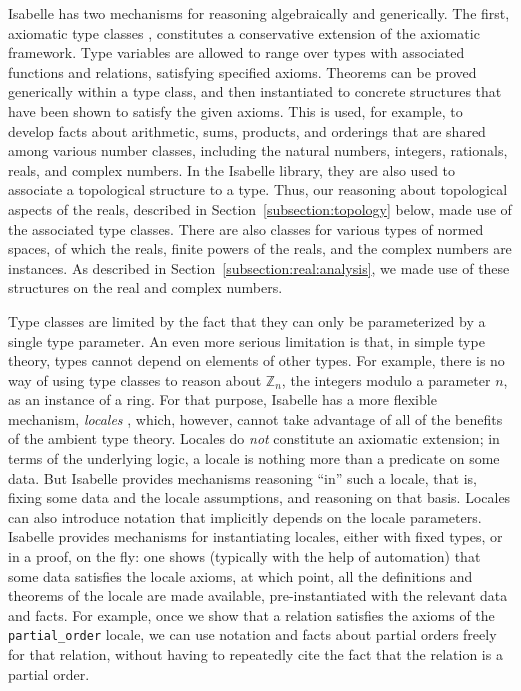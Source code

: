 \documentclass{svjour3}
\newcommand{\ZZ}{\mathbb{Z}}
\begin{document}
Isabelle has two mechanisms for reasoning algebraically and generically. The first, axiomatic type classes \cite{wenzel:97}, constitutes a conservative extension of the axiomatic framework. Type variables are allowed to range over types with associated functions and relations, satisfying specified axioms. Theorems can be proved generically within a type class, and then instantiated to concrete structures that have been shown to satisfy the given axioms. This is used, for example, to develop facts about arithmetic, sums, products, and orderings that are shared among various number classes, including the natural numbers, integers, rationals, reals, and complex numbers. In the Isabelle library, they are also used to associate a topological structure to a type. Thus, our reasoning about topological aspects of the reals, described in Section~\ref{subsection:topology} below, made use of the associated type classes. There are also classes for various types of normed spaces, of which the reals, finite powers of the reals, and the complex numbers are instances. As described in Section~\ref{subsection:real:analysis}, we made use of these structures on the real and complex numbers.

Type classes are limited by the fact that they can only be parameterized by a single type parameter. An even more serious limitation is that, in simple type theory, types cannot depend on elements of other types. For example, there is no way of using type classes to reason about $\ZZ_n$, the integers modulo a parameter $n$, as an instance of a ring. For that purpose, Isabelle has a more flexible mechanism, \emph{locales} \cite{ballarin:06}, which, however, cannot take advantage of all of the benefits of the ambient type theory. Locales do \emph{not} constitute an axiomatic extension; in terms of the underlying logic, a locale is nothing more than a predicate on some data. But Isabelle provides mechanisms reasoning ``in'' such a locale, that is, fixing some data and the locale assumptions, and reasoning on that basis. Locales can also introduce notation that implicitly depends on the locale parameters. Isabelle provides mechanisms for instantiating locales, either with fixed types, or in a proof, on the fly: one shows (typically with the help of automation) that some data satisfies the locale axioms, at which point, all the definitions and theorems of the locale are made available, pre-instantiated with the relevant data and facts. For example, once we show that a relation satisfies the axioms of the \texttt{partial\_order} locale, we can use notation and facts about partial orders freely for that relation, without having to repeatedly cite the fact that the relation is a partial order.
\end{document}
